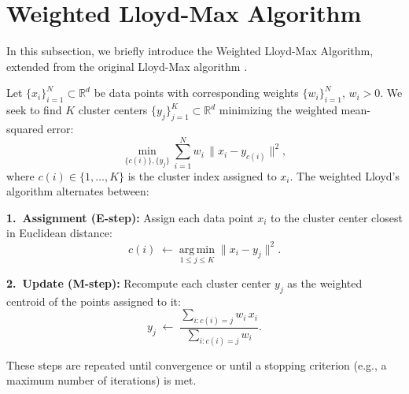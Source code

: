 \section{Weighted Lloyd-Max Algorithm}
\label{sec:lloyd-max}

In this subsection, we briefly introduce the Weighted Lloyd-Max Algorithm, extended from the original Lloyd-Max algorithm \cite{lloyd1982least,max1960quantizing}.

Let \(\{x_i\}_{i=1}^N \subset \mathbb{R}^d\) be data points with corresponding weights \(\{w_i\}_{i=1}^N\), \(w_i > 0\). We seek to find \(K\) cluster centers \(\{y_j\}_{j=1}^K \subset \mathbb{R}^d\) minimizing the weighted mean-squared error:
\[
\min_{\{c(i)\}, \{y_j\}} 
\sum_{i=1}^N w_i \,\bigl\|x_i - y_{c(i)}\bigr\|^2,
\]
where \(c(i) \in \{1, \dots, K\}\) is the cluster index assigned to \(x_i\). The weighted Lloyd's algorithm alternates between:

\noindent\textbf{1.\ Assignment (E-step):} Assign each data point \(x_i\) to the cluster center closest in Euclidean distance:
\begin{equation}
  c(i) \;\leftarrow\; \underset{1 \le j \le K}{\mathrm{arg\,min}}\; \bigl\| x_i - y_j \bigr\|^2.
  \tag{E-step}\label{eq:e-step}
\end{equation}

\noindent\textbf{2.\ Update (M-step):} Recompute each cluster center \(y_j\) as the weighted centroid of the points assigned to it:
\begin{equation}
  y_j \;\leftarrow\; \frac{\sum_{i : c(i) = j} w_i \, x_i}{\sum_{i : c(i) = j} w_i}.
  \tag{M-step}\label{eq:m-step}
\end{equation}

These steps are repeated until convergence or until a stopping criterion (e.g., a maximum number of iterations) is met.